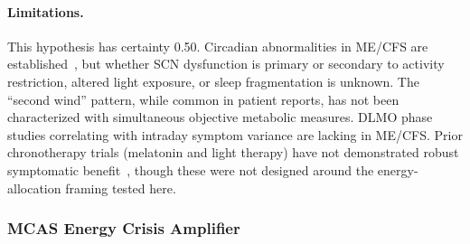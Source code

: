 \begin{hypothesis}
\paragraph{Limitations.}
This hypothesis has certainty 0.50. Circadian abnormalities in ME/CFS are established~\cite{cambras2018circadian,williams2001circadian}, but whether SCN dysfunction is primary or secondary to activity restriction, altered light exposure, or sleep fragmentation is unknown. The ``second wind'' pattern, while common in patient reports, has not been characterized with simultaneous objective metabolic measures. DLMO phase studies correlating with intraday symptom variance are lacking in ME/CFS. Prior chronotherapy trials (melatonin and light therapy) have not demonstrated robust symptomatic benefit~\cite{williams2002therapy}, though these were not designed around the energy-allocation framing tested here.
\end{hypothesis}

\subsubsection{MCAS Energy Crisis Amplifier}

